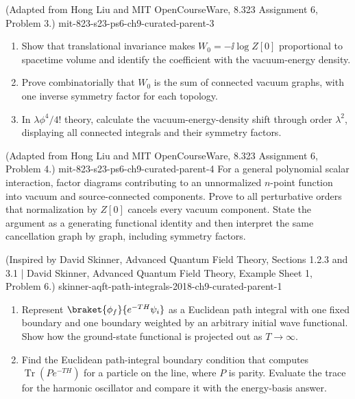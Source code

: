 \begin{enumerate}
  {(Adapted from Hong Liu and MIT OpenCourseWare, 8.323 Assignment 6, Problem 3.)}
  {mit-823-s23-ps6-ch9-curated-parent-3}
\begin{enumerate}
\item Show that translational invariance makes
\(W_0=-\ii\log Z[0]\) proportional to spacetime volume and identify the
coefficient with the vacuum-energy density.
\item Prove combinatorially that \(W_0\) is the sum of connected vacuum
graphs, with one inverse symmetry factor for each topology.
\item In \(\lambda\phi^4/4!\) theory, calculate the vacuum-energy-density
shift through order \(\lambda^2\), displaying all connected integrals and
their symmetry factors.
\end{enumerate}

  {(Adapted from Hong Liu and MIT OpenCourseWare, 8.323 Assignment 6, Problem 4.)}
  {mit-823-s23-ps6-ch9-curated-parent-4}
For a general polynomial scalar interaction, factor diagrams contributing
to an unnormalized \(n\)-point function into vacuum and source-connected
components.  Prove to all perturbative orders that normalization by
\(Z[0]\) cancels every vacuum component.  State the argument as a generating
functional identity and then interpret the same cancellation graph by
graph, including symmetry factors.

  {(Inspired by David Skinner, Advanced Quantum Field Theory, Sections 1.2.3 and 3.1 | David Skinner, Advanced Quantum Field Theory, Example Sheet 1, Problem 6.)}
  {skinner-aqft-path-integrals-2018-ch9-curated-parent-1}
\begin{enumerate}
\item
Represent \(\braket{\phi_f}{e^{-TH}\psi_i}\) as a Euclidean path integral
with one fixed boundary and one boundary weighted by an arbitrary initial
wave functional.  Show how the ground-state functional is projected out as
\(T\to\infty\).
\item
Find the Euclidean path-integral boundary condition that computes
\(\operatorname{Tr}(Pe^{-TH})\) for a particle on the line, where \(P\)
is parity.  Evaluate the trace for the harmonic oscillator and compare it
with the energy-basis answer.
\end{enumerate}


\end{enumerate}
